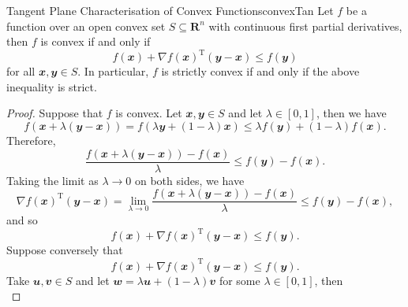 \documentclass[math]{amznotes}
\theoremstyle{remark}
\begin{document}
\begin{probox}{Tangent Plane Characterisation of Convex Functions}{convexTan}
    Let $f$ be a function over an open convex set $S \subseteq \mathbf{R}^n$ with continuous first partial derivatives, then $f$ is convex if and only if 
    \begin{equation*}
        f(\mathbfit{x}) + \nabla f(\mathbfit{x})^{\mathrm{T}}(\mathbfit{y - x}) \leq f(\mathbfit{y})
    \end{equation*}
    for all $\mathbfit{x}, \mathbfit{y} \in S$. In particular, $f$ is strictly convex if and only if the above inequality is strict.
    \tcblower   
    \begin{proof}
        Suppose that $f$ is convex. Let $\mathbfit{x}, \mathbfit{y} \in S$ and let $\lambda \in [0, 1]$, then we have
        \begin{equation*}
            f\left(\mathbfit{x} + \lambda(\mathbfit{y} - \mathbfit{x})\right) = f\left(\lambda\mathbfit{y} + (1 - \lambda)\mathbfit{x}\right) \leq \lambda f(\mathbfit{y}) + (1 - \lambda)f(\mathbfit{x}).
        \end{equation*} 
        Therefore,
        \begin{equation*}
            \frac{f\left(\mathbfit{x} + \lambda(\mathbfit{y} - \mathbfit{x})\right) - f(\mathbfit{x})}{\lambda} \leq f(\mathbfit{y}) - f(\mathbfit{x}).
        \end{equation*}
        Taking the limit as $\lambda \to 0$ on both sides, we have
        \begin{equation*}
            \nabla f(\mathbfit{x})^{\mathrm{T}}(\mathbfit{y - x}) = \lim_{\lambda \to 0}\frac{f\left(\mathbfit{x} + \lambda(\mathbfit{y} - \mathbfit{x})\right) - f(\mathbfit{x})}{\lambda} \leq f(\mathbfit{y}) - f(\mathbfit{x}),
        \end{equation*}
        and so
        \begin{equation*}
            f(\mathbfit{x}) + \nabla f(\mathbfit{x})^{\mathrm{T}}(\mathbfit{y - x}) \leq f(\mathbfit{y}).
        \end{equation*}
        Suppose conversely that 
        \begin{equation*}
            f(\mathbfit{x}) + \nabla f(\mathbfit{x})^{\mathrm{T}}(\mathbfit{y - x}) \leq f(\mathbfit{y}).
        \end{equation*}
        Take $\mathbfit{u}, \mathbfit{v} \in S$ and let $\mathbfit{w} = \lambda\mathbfit{u} + (1 - \lambda)\mathbfit{v}$ for some $\lambda \in [0, 1]$, then
        \begin{displaymath}

\end{displaymath}
\end{proof}
\end{probox}
\end{document}
